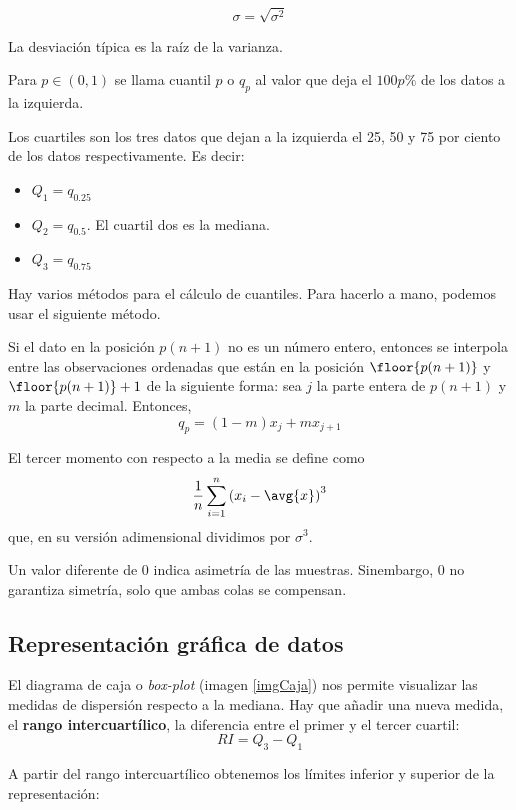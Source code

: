 \documentclass{apuntes}
\begin{document}
\begin{defn}
\[\sigma = \sqrt{\sigma^2} \]

La desviación típica es la raíz de la varianza.
\end{defn}

\begin{defn}[Cuantil]
Para $p\in (0, 1)$ se llama cuantil $p$ o $q_p$ al valor que deja el $100p \%$ de los datos a la izquierda.
\end{defn}

\begin{defn}[Cuartil]
Los cuartiles son los tres datos que dejan a la izquierda el 25, 50 y 75 por ciento de los datos respectivamente. Es decir:

\begin{itemize}
\item $Q_1 = q_{0.25}$
\item $Q_2 = q_{0.5}$. El cuartil dos es la mediana.
\item $Q_3 = q_{0.75}$
\end{itemize}
\end{defn}

Hay varios métodos para el cálculo de cuantiles. Para hacerlo a mano, podemos usar el siguiente método.

Si el dato en la posición $p(n+1)$ no es un número entero, entonces se interpola entre las observaciones ordenadas que están en la posición $\floor{p(n+1)}$ y $\floor{p(n+1)} + 1$ de la siguiente forma: sea $j$ la parte entera de $p(n+1)$ y $m$ la parte decimal. Entonces, \[ q_p = (1-m)x_j + m x_{j+1} \]


\begin{defn}
El tercer momento con respecto a la media se define como \[ \frac{1}{n}\sum_{i=1}^n\left(x_i-\avg{x}\right)^3 \] que, en su versión adimensional dividimos por $\sigma^3$.
\end{defn}

Un valor diferente de 0 indica asimetría de las muestras. Sinembargo, 0 no garantiza simetría, solo que ambas colas se compensan.

\subsection{Representación gráfica de datos}

\begin{defn}
El diagrama de caja o \textit{box-plot}  (imagen \ref{imgCaja}) nos permite visualizar las medidas de dispersión respecto a la mediana. Hay que añadir una nueva medida, el \textbf{rango intercuartílico}, la diferencia entre el primer y el tercer cuartil: \[RI = Q_3 - Q_1 \]

A partir del rango intercuartílico obtenemos los límites inferior y superior de la representación:

\end{defn}
\end{document}
